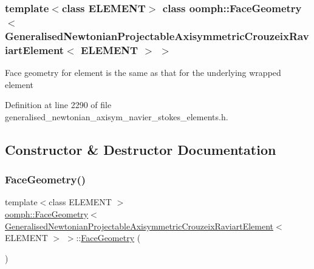 \subsubsection*{template$<$class E\+L\+E\+M\+E\+NT$>$\newline
class oomph\+::\+Face\+Geometry$<$ Generalised\+Newtonian\+Projectable\+Axisymmetric\+Crouzeix\+Raviart\+Element$<$ E\+L\+E\+M\+E\+N\+T $>$ $>$}

Face geometry for element is the same as that for the underlying wrapped element 

Definition at line 2290 of file generalised\+\_\+newtonian\+\_\+axisym\+\_\+navier\+\_\+stokes\+\_\+elements.\+h.



\subsection{Constructor \& Destructor Documentation}
\mbox{\label{classoomph_1_1FaceGeometry_3_01GeneralisedNewtonianProjectableAxisymmetricCrouzeixRaviartElement_3_01ELEMENT_01_4_01_4_ae9c75d10522bdbd05036566cec612f2e}} 
\subsubsection{\texorpdfstring{Face\+Geometry()}{FaceGeometry()}}
{\footnotesize\ttfamily template$<$class E\+L\+E\+M\+E\+NT $>$ \\
\hyperlink{classoomph_1_1FaceGeometry}{oomph\+::\+Face\+Geometry}$<$ \hyperlink{classoomph_1_1GeneralisedNewtonianProjectableAxisymmetricCrouzeixRaviartElement}{Generalised\+Newtonian\+Projectable\+Axisymmetric\+Crouzeix\+Raviart\+Element}$<$ E\+L\+E\+M\+E\+NT $>$ $>$\+::\hyperlink{classoomph_1_1FaceGeometry}{Face\+Geometry} (\begin{DoxyParamCaption}{ }\end{DoxyParamCaption})\hspace{0.3cm}{\ttfamily [inline]}}



